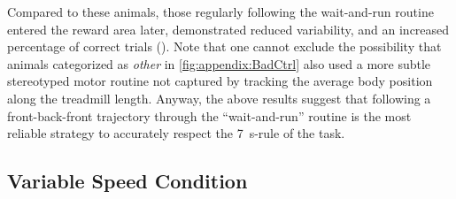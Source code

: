 Compared to these animals, those regularly following the wait-and-run routine entered the reward area later, demonstrated reduced variability, and an increased percentage of correct trials ().
Note that one cannot exclude the possibility that animals categorized as \textit{other} in \autoref{fig:appendix:BadCtrl} also used a more subtle stereotyped motor routine not captured by tracking the average body position along the treadmill length.
Anyway, the above results suggest that following a front-back-front trajectory through the ``wait-and-run'' routine is the most reliable strategy to accurately respect the 7~s-rule of the task.


\subsection{Variable Speed Condition}
\label{ch:time:varSpeed}

